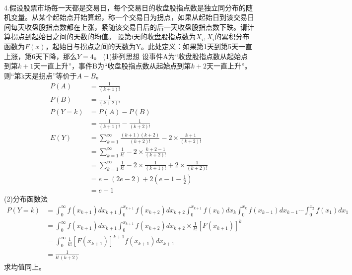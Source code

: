 \documentclass[UTF8]{ctexart}
\begin{document}
\paragraph{}
4.假设股票市场每一天都是交易日，每个交易日的收盘股指点数是独立同分布的随机变量。从某个起始点开始算起，称一个交易日为拐点，如果从起始日到该交易日间每天收盘股指点数都在上涨，紧随该交易日后的后一天收盘股指点数下跌。请计算拐点到起始日之间的天数的均值。
设第i天的收盘股指点数为$X_i,X_i$的累积分布函数为$F(x)$，起始日与拐点之间的天数为Y。此处定义：如果第1天到第5天一直上涨，第6天下降，那么$Y=4$。
(1)排列思想
设事件A为“收盘股指点数从起始点到第$k+1$天一直上升”，事件B为“收盘股指点数从起始点到第$k+2$天一直上升”。则“第k天是拐点”等价于$A-B$。
\begin{equation*}
\begin{aligned}
P(A)&=\frac{1}{(k+1)!}\\
P(B)&=\frac{1}{(k+2)!}\\
P(Y=k)&=P(A)-P(B)\\
&=\frac{1}{(k+1)!}-\frac{1}{(k+2)!}\\
E(Y)&=\sum_{k=1}^\infty{\frac{(k+1)(k+2)}{(k+2)!}-2\times \frac{k+1}{(k+2)!}}\\
&=\sum_{k=1}^{\infty}{\frac{1}{k!}-2\times \frac{k+2-1}{(k+2)!}}\\
&=\sum_{k=1}^{\infty}{\frac{1}{k!}-2\times \frac{1}{(k+1)!} + 2\times \frac{1}{(k+2)!}}\\
&=e-(2e-2)+2(e-1-\frac{1}{2})\\
&=e-1
\end{aligned}
\end{equation*}
(2)分布函数法
\begin{equation*}
\begin{aligned}
P(Y=k)&=\int_0^\infty f(x_{k+1})dx_{k+1}\int_0^{x_{k+1}} f(x_{k+2})dx_{k+2}\int_0^{x_{k+1}} f(x_k)dx_k\int_0^{x_k} f(x_{k-1})dx_{k-1}\cdots \int_0^{x_2} f(x_1)dx_1\\
&=\int_0^\infty f(x_{k+1})dx_{k+1}\int_0^{x_{k+1}} f(x_{k+2})dx_{k+2}\times \frac{1}{k!}[F(x_{k+1})]^k\\
&=\int_0^\infty \frac{1}{k!}[F(x_{k+1})]^{k+1}f(x_{k+1})dx_{k+1}\\
&=\frac{1}{k!(k+2)}
\end{aligned}
\end{equation*}
求均值同上。
\end{document}
